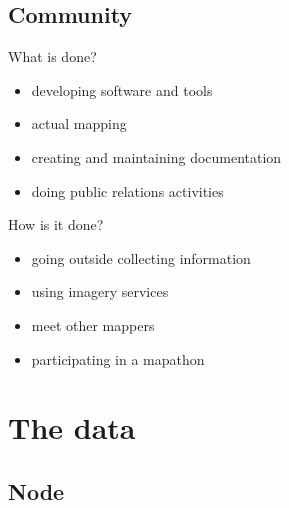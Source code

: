 \documentclass{beamer}
\begin{document}
	\subsection{Community}

	\begin{frame}{What is done?}
		\begin{itemize}
			\item developing software and tools
			\item actual mapping
			\item creating and maintaining documentation
			\item doing public relations activities
		\end{itemize}
	\end{frame}

	\begin{frame}{How is it done?}
		\begin{itemize}
		\item going outside collecting information
		\item using imagery services
		\item meet other mappers
		\item participating in a mapathon
		\end{itemize}
	\end{frame}

	\section{The data}
	
	\subsection{Node}
	
\end{document}
